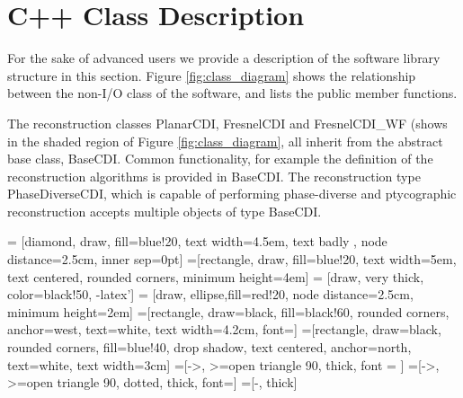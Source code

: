 \documentclass[]{nadia}
\begin{document}
\newpage

\appendix

\section{C++ Class Description} 

For the sake of advanced users we provide a description of the
software library structure in this section. Figure
\ref{fig:class_diagram} shows the relationship between the non-I/O
class of the software, and lists the public member functions.

The reconstruction classes PlanarCDI, FresnelCDI and FresnelCDI\_WF
(shows in the shaded region of Figure \ref{fig:class_diagram}, all
inherit from the abstract base class, BaseCDI. Common functionality,
for example the definition of the reconstruction algorithms is
provided in BaseCDI. The reconstruction type PhaseDiverseCDI, which is
capable of performing phase-diverse and ptycographic reconstruction
accepts multiple objects of type BaseCDI.

 = [diamond, draw, fill=blue!20,
text width=4.5em, text badly , node distance=2.5cm, inner sep=0pt]
=[rectangle, draw, fill=blue!20, text width=5em, text centered, rounded corners, minimum height=4em]
 = [draw, very thick, color=black!50, -latex']
 = [draw, ellipse,fill=red!20, node distance=2.5cm,
minimum height=2em]
=[rectangle, draw=black, fill=black!60, rounded corners,
anchor=west, text=white, text width=4.2cm, font=\tiny]
=[rectangle, draw=black, rounded corners, fill=blue!40, drop shadow,
text centered, anchor=north, text=white, text width=3cm]
=[->, >=open triangle 90, thick, font = \tiny]
=[->, >=open triangle 90, dotted, thick, font=\tiny]
=[-, thick]
\end{document}
